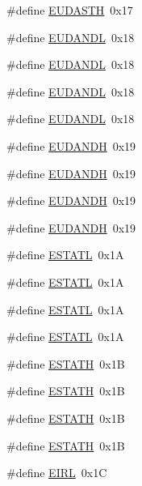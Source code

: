 \begin{DoxyCompactItemize}
\#define \mbox{\hyperlink{group___b_a_n_k__0_gae43040f2f496d1a975d51379d4ce5817}{E\+U\+D\+A\+S\+TH}}~0x17
\item 
\#define \mbox{\hyperlink{group___b_a_n_k__0_ga177907282eb8c3ffd068ebf7dd9504da}{E\+U\+D\+A\+N\+DL}}~0x18
\item 
\#define \mbox{\hyperlink{group___b_a_n_k__0_ga177907282eb8c3ffd068ebf7dd9504da}{E\+U\+D\+A\+N\+DL}}~0x18
\item 
\#define \mbox{\hyperlink{group___b_a_n_k__0_ga177907282eb8c3ffd068ebf7dd9504da}{E\+U\+D\+A\+N\+DL}}~0x18
\item 
\#define \mbox{\hyperlink{group___b_a_n_k__0_ga177907282eb8c3ffd068ebf7dd9504da}{E\+U\+D\+A\+N\+DL}}~0x18
\item 
\#define \mbox{\hyperlink{group___b_a_n_k__0_ga15380652ec098bda9a52836c9dae9a6d}{E\+U\+D\+A\+N\+DH}}~0x19
\item 
\#define \mbox{\hyperlink{group___b_a_n_k__0_ga15380652ec098bda9a52836c9dae9a6d}{E\+U\+D\+A\+N\+DH}}~0x19
\item 
\#define \mbox{\hyperlink{group___b_a_n_k__0_ga15380652ec098bda9a52836c9dae9a6d}{E\+U\+D\+A\+N\+DH}}~0x19
\item 
\#define \mbox{\hyperlink{group___b_a_n_k__0_ga15380652ec098bda9a52836c9dae9a6d}{E\+U\+D\+A\+N\+DH}}~0x19
\item 
\#define \mbox{\hyperlink{group___b_a_n_k__0_ga4b079f3e571c8f57eb82838f969bb918}{E\+S\+T\+A\+TL}}~0x1A
\item 
\#define \mbox{\hyperlink{group___b_a_n_k__0_ga4b079f3e571c8f57eb82838f969bb918}{E\+S\+T\+A\+TL}}~0x1A
\item 
\#define \mbox{\hyperlink{group___b_a_n_k__0_ga4b079f3e571c8f57eb82838f969bb918}{E\+S\+T\+A\+TL}}~0x1A
\item 
\#define \mbox{\hyperlink{group___b_a_n_k__0_ga4b079f3e571c8f57eb82838f969bb918}{E\+S\+T\+A\+TL}}~0x1A
\item 
\#define \mbox{\hyperlink{group___b_a_n_k__0_ga13d1af7417b869b95d04712f64fa0272}{E\+S\+T\+A\+TH}}~0x1B
\item 
\#define \mbox{\hyperlink{group___b_a_n_k__0_ga13d1af7417b869b95d04712f64fa0272}{E\+S\+T\+A\+TH}}~0x1B
\item 
\#define \mbox{\hyperlink{group___b_a_n_k__0_ga13d1af7417b869b95d04712f64fa0272}{E\+S\+T\+A\+TH}}~0x1B
\item 
\#define \mbox{\hyperlink{group___b_a_n_k__0_ga13d1af7417b869b95d04712f64fa0272}{E\+S\+T\+A\+TH}}~0x1B
\item 
\#define \mbox{\hyperlink{group___b_a_n_k__0_ga2bbf74cf1cb5367d111476ffd5fcdd33}{E\+I\+RL}}~0x1C

\end{DoxyCompactItemize}
